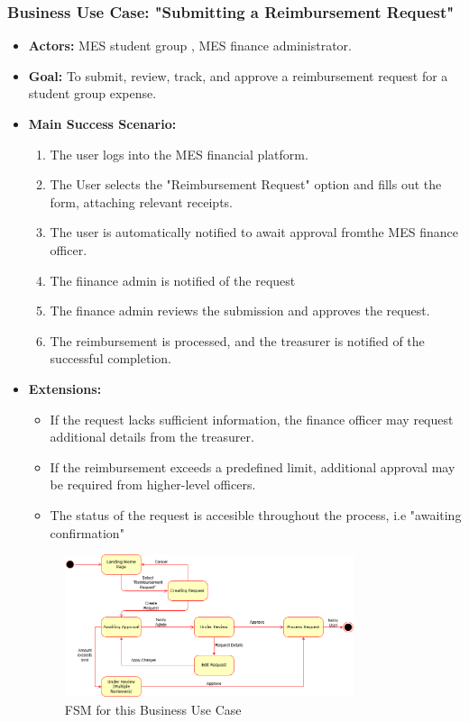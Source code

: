 \documentclass[12pt]{article}
\begin{document}
\subsubsection{\textbf{Business Use Case:} "Submitting a Reimbursement Request"}
\begin{itemize}
    \item \textbf{Actors:} MES student group , MES finance administrator.
    \item \textbf{Goal:} To submit, review, track, and approve a reimbursement request for a student group expense.
    \item \textbf{Main Success Scenario:} 
    \begin{enumerate}
        \item The user logs into the MES financial platform.
        \item The User selects the "Reimbursement Request" option and fills out the form, attaching relevant receipts.
        \item The user is automatically notified to await approval fromthe MES finance officer.
        \item The fiinance admin is notified of the request
        \item The finance admin reviews the submission and approves the request.
        \item The reimbursement is processed, and the treasurer is notified of the successful completion.
    \end{enumerate}
    \item \textbf{Extensions:} 
    \begin{itemize}
        \item If the request lacks sufficient information, the finance officer may request additional details from the treasurer. 
        \item If the reimbursement exceeds a predefined limit, additional approval may be required from higher-level officers.
        \item The status of the request is accesible throughout the process, i.e "awaiting confirmation"
    \end{itemize}

    \begin{figure}[h!]
        \centering
        \includegraphics[width=0.8\textwidth]{./imgs/case diagram 1.png}
        \caption{FSM for this Business Use Case}
    \end{figure}
\end{itemize}
\end{document}
